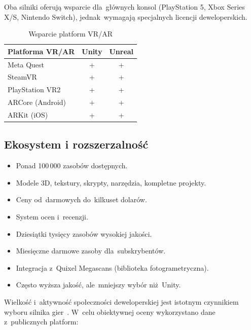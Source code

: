 Oba silniki oferują wsparcie dla~głównych konsol (PlayStation 5, Xbox Series X/S, Nintendo Switch), jednak~wymagają specjalnych licencji deweloperskich.


\begin{table}[h!]
    \centering
    \caption{Wsparcie platform VR/AR}
    \label{tab:platform-vr}
    \begin{tabular}{|l|c|c|}
        \hline
        \textbf{Platforma VR/AR} & \textbf{Unity} & \textbf{Unreal} \\
        \hline\hline
        Meta Quest & + & + \\
        \hline
        SteamVR & + & + \\
        \hline
        PlayStation VR2 & + & + \\
        \hline
        ARCore (Android) & + & + \\
        \hline
        ARKit (iOS) & + & + \\
        \hline
    \end{tabular}
\end{table}

\subsection{Ekosystem i rozszerzalność}


\begin{itemize}
    \item Ponad 100\,000 zasobów dostępnych.
    \item Modele 3D, tekstury, skrypty, narzędzia, kompletne projekty.
    \item Ceny od~darmowych do~kilkuset dolarów.
    \item System ocen i~recenzji.
\end{itemize}

\begin{itemize}
    \item Dziesiątki tysięcy zasobów wysokiej jakości.
    \item Miesięczne darmowe zasoby dla~subskrybentów.
    \item Integracja z~Quixel Megascans (biblioteka fotogrametryczna).
    \item Często wyższa jakość, ale~mniejszy wybór niż~Unity.
\end{itemize}


Wielkość i~aktywność społeczności deweloperskiej jest istotnym czynnikiem wyboru silnika gier~\cite{christopoulou2017overview}. W~celu obiektywnej oceny wykorzystano dane z~publicznych platform:

